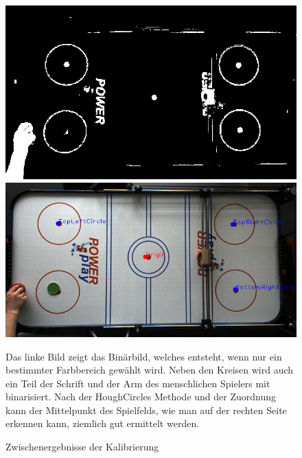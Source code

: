 \begin{figure} [h]
\begin{minipage}[t]{0.4\textwidth}
\vspace{0pt}
\includegraphics[scale =0.3]{images/kalib_bin}


\end{minipage}
\hspace{0.1\textwidth}
\begin{minipage}[t]{0.4\textwidth}
\vspace{0pt}
\includegraphics[scale =0.3]{images/kalib_circ}

\end{minipage}
 \caption{Zwischenergebnisse der Kalibrierung}
 \label{kalib_process}
\vspace{5pt}

Das linke Bild zeigt das Binärbild, welches entsteht, wenn nur ein bestimmter Farbbereich gewählt wird. Neben den Kreisen wird auch ein Teil der Schrift und der Arm des menschlichen Spielers mit binarisiert. Nach der HoughCircles Methode und der Zuordnung kann der Mittelpunkt des Spielfelds, wie man auf der rechten Seite erkennen kann, ziemlich gut ermittelt werden.
\end{figure}

